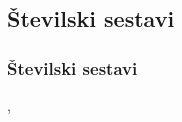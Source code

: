 



    \subsection{Številski sestavi}

        \begin{frame}
            \frametitle{Številski sestavi}

            ,
        \end{frame}

